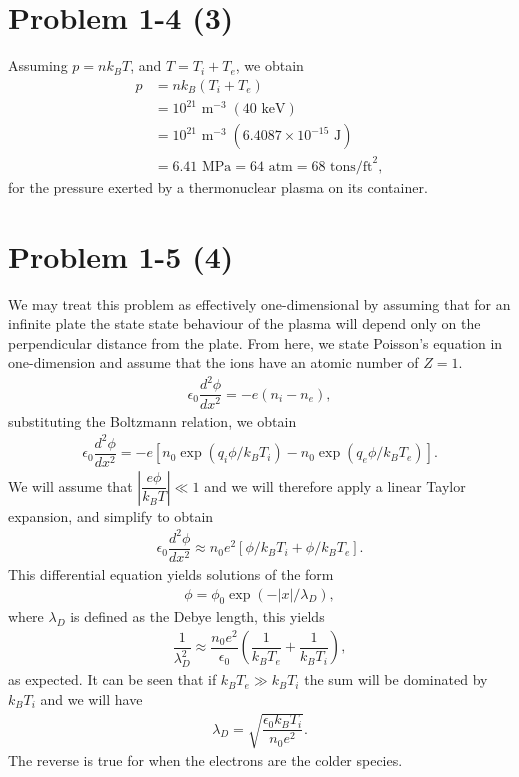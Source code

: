 
\section*{Problem 1-4 (3)}
\label{sec:1-4}
Assuming \(p = nk_BT\), and \(T = T_i + T_e\), we obtain
\begin{align}
	p &= nk_B(T_i + T_e) \\
	&= 10^{21}\text{ m}^{-3} \;(40\text{ keV}) \\
	&= 10^{21}\text{ m}^{-3} \;(6.4087\times10^{-15}\text{ J}) \\
	&= 6.41 \text{ MPa} = 64 \text{ atm} = 68 \text{ tons/ft}^2,
\end{align}
for the pressure exerted by a thermonuclear plasma on its container.

\section*{Problem 1-5 (4)}
\label{sec:1-5}
We may treat this problem as effectively one-dimensional by assuming that for an infinite plate the state state behaviour of the plasma will depend only on the perpendicular distance from the plate. From here, we state Poisson's equation in one-dimension and assume that the ions have an atomic number of \(Z = 1\).
\begin{align}
	\epsilon_0 \dfrac{d^2 \phi}{dx^2} = -e\left(n_i - n_e \right),
\end{align}
substituting the Boltzmann relation, we obtain
\begin{align}
	\epsilon_0 \dfrac{d^2 \phi}{dx^2} = -e\left[n_0\exp{(q_i\phi/k_BT_i)} - n_0\exp{(q_e\phi/k_BT_e)} \right].
\end{align}
We will assume that \(|\dfrac{e\phi}{k_BT}| \ll 1 \) and we will therefore apply a linear Taylor expansion, and simplify to obtain
\begin{align}
	\epsilon_0 \dfrac{d^2 \phi}{dx^2} \approx n_0e^2\left[\phi/k_BT_i + \phi/k_BT_e \right].
\end{align}
This differential equation yields solutions of the form
\begin{align}
	\phi = \phi_0 \exp{(-|x|/\lambda_D)},
\end{align}
where \(\lambda_D \) is defined as the Debye length, this yields
\begin{align}
	\dfrac{1}{\lambda_D^2} \approx \dfrac{n_0e^2}{\epsilon_0}\left(\dfrac{1}{k_BT_e} + \dfrac{1}{k_BT_i}  \right),
\end{align}
as expected. It can be seen that if \(k_BT_e \gg k_BT_i \) the sum will be dominated by \(k_BT_i \) and we will have
\begin{align}
	\lambda_D = \sqrt{\dfrac{\epsilon_0 k_BT_i}{n_0e^2}}.
\end{align}
The reverse is true for when the electrons are the colder species.

